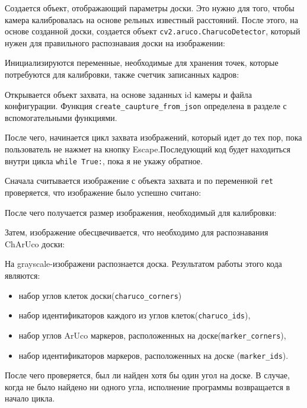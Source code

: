 \documentclass[12pt, a4paper]{article}
\begin{document}
Создается объект, отображающий параметры доски. Это нужно для того, чтобы
камера калибровалась на основе рельных известный расстояний. После этого, на основе
созданной доски, создается объект \texttt{cv2.aruco.CharucoDetector}, который
нужен для правильного распознаваия доски на изображении:

Инициализируются переменные, необходимые для хранения точек, которые потребуются
для калибровки, также счетчик записанных кадров:

Открывается объект захвата, на основе заданных id камеры и файла конфигурации.
Функция \texttt{create\_caupture\_from\_json} определена в разделе с
вспомогательными функциями.

После чего, начинается цикл захвата изображений, который идет до тех пор, пока
пользователь не нажмет на кнопку Escape.Последующий код будет
находиться внутри цикла \texttt{while True:}, пока я не укажу обратное.
\par
Сначала считывается изображение с объекта захвата и по переменной
\texttt{ret} проверяется, что изображение было успешно считано:

После чего получается размер изображения, необходимый для калибровки:

Затем, изображение обесцвечивается, что необходимо для распознавания ChArUco доски:

На grayscale-изображени распознается доска. Результатом работы этого кода
являются: 
\begin{itemize}
  \item набор углов клеток доски(\texttt{charuco\_corners})
  \item набор идентификаторов каждого из углов клеток(\texttt{charuco\_ids}),
  \item набор углов ArUco маркеров, расположенных на доске(\texttt{marker\_corners}),
  \item набор идентификаторов маркеров, расположенных на доске (\texttt{marker\_ids}).
\end{itemize}
После чего проверяется, был ли найден хотя бы один угол на доске.
В случае, когда не было найдено ни одного угла, исполнение программы
возвращается в начало цикла.
\end{document}

